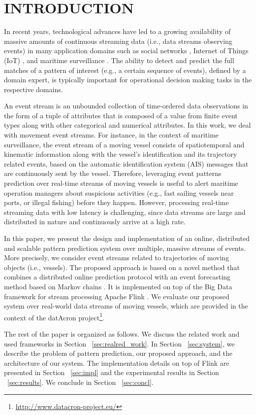 \section{INTRODUCTION}


\par In recent years, technological advances have led to a growing availability of massive amounts of continuous streaming data (i.e., data streams observing events) in many application domains such as social networks \cite{mathioudakis2010twittermonitor}, Internet of Things (IoT) \cite{miorandi2012internet}, and maritime surveillance \cite{patroumpas2015event}.  The ability to detect and predict the full matches of a pattern of interest (e.g., a certain sequence of events), defined by a domain expert, is typically important for operational decision making tasks in the respective domains.

\par An event stream is an unbounded collection of time-ordered data observations in the form of a tuple of attributes that is composed of a value from finite event types along with other categorical and numerical attributes. In this work, we deal with movement event streams. For instance, in the context of maritime surveillance, the event stream of a moving vessel consists of spatiotemporal and kinematic information along with the vessel's identification and its trajectory related events, based on the automatic identification system (AIS) \cite{ais} messages that are continuously sent by the vessel. Therefore, leveraging event patterns prediction over real-time streams of moving vessels is useful to alert maritime operation managers about suspicious activities (e.g., fast sailing vessels near ports, or illegal fishing) before they happen. However, processing real-time streaming data with low latency is challenging, since data streams are large and distributed in nature and continuously arrive at a high rate. 
\par In this paper, we present the design and implementation of an online, distributed and scalable pattern prediction system over multiple, massive streams of events. More precisely, we consider event streams related to trajectories of moving objects (i.e., vessels). The proposed approach is based on a novel method that combines a distributed online prediction protocol \cite{dekel2012optimal,kamp2014communication} with an event forecasting method based on Markov chains \cite{alevizos2017event}. It is implemented on top of the Big Data framework for stream processing Apache Flink \cite{Flink}. We evaluate our proposed system over real-world data streams of moving vessels, which are provided in the context of the datAcron project\footnote{\url{http://www.datacron-project.eu/}}.

\par The rest of the paper is organized as follows. We discuss the related work and used frameworks in Section ~\ref{sec:realred_work}. In Section ~\ref{sec:system}, we describe the problem of pattern prediction, our proposed approach, and the architecture of our system. The implementation details on top of Flink are presented in Section ~\ref{sec:impl} and the experimental results in Section ~\ref{sec:results}. We conclude in Section ~\ref{sec:concl}.
